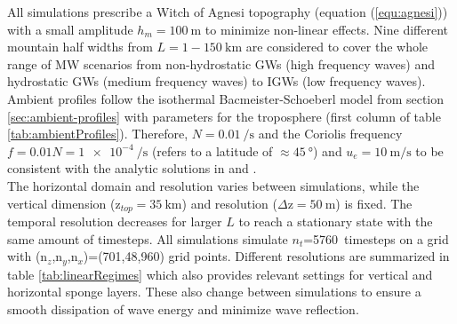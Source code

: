 All simulations prescribe a Witch of Agnesi topography (equation (\ref{equ:agnesi})) with a small amplitude $h_m = \SI{100}{\meter}$ to minimize non-linear effects. Nine different mountain half widths from $L = 1-\SI{150}{\kilo\meter}$ are considered to cover the whole range of MW scenarios from non-hydrostatic GWs (high frequency waves) and hydrostatic GWs (medium frequency waves) to IGWs (low frequency waves). Ambient profiles follow the isothermal Bacmeister-Schoeberl model from section \ref{sec:ambient-profiles} with parameters for the troposphere (first column of table \ref{tab:ambientProfiles}). Therefore, $N=\SI{0.01}{\per\second}$ and the Coriolis frequency $f = 0.01 N = \SI{1e-4}{\per\second}$ (refers to a latitude of $\approx \SI{45}{\degree}$) and $u_e =\SI{10}{\meter\per\second}$ to be consistent with the analytic solutions in \textcite[]{queney_problem_1948} and \textcite[]{gill_atmosphere-ocean_1982}. \\
The horizontal domain and resolution varies between simulations, while the vertical dimension (z$_{top}=\SI{35}{\kilo\meter}$) and resolution ($\Delta$z$=\SI{50}{\meter}$) is fixed. The temporal resolution decreases for larger $L$ to reach a stationary state with the same amount of timesteps. All simulations simulate $n_t$=\SI{5760}{timesteps} on a grid with (n$_z$,n$_y$,n$_x$)=(701,48,960) grid points. Different resolutions are summarized in table \ref{tab:linearRegimes} which also provides relevant settings for vertical and horizontal sponge layers. These also change between simulations to ensure a smooth dissipation of wave energy and minimize wave reflection. \\
%
